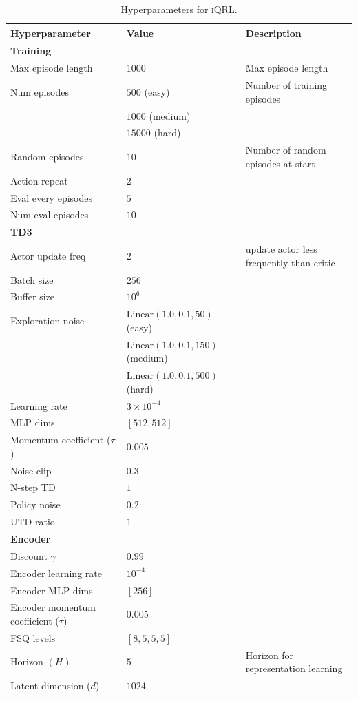 \documentclass{article}
\theoremstyle{plain}
\theoremstyle{definition}
\theoremstyle{remark}
\newcommand{\our}{\textsc{iQRL}\xspace}
\begin{document}
\begin{table}[t]
\caption{Hyperparameters for \our.}
\label{tab:hyperparameters}
\vskip 0.15in
\begin{center}
\begin{small}
\begin{sc}
\begin{tabular}{lll}
\toprule
Hyperparameter & Value & Description \\
\midrule
\textbf{Training} & & \\
Max episode length & 1000 &  Max episode length \\
Num episodes & $500$ (easy) & Number of training episodes \\
             & $1000$ (medium) & \\
             & $15000$ (hard) & \\
Random episodes & $10$ & Number of random episodes at start \\
Action repeat & 2 & \\
Eval every episodes & $5$ & \\
Num eval episodes & $10$ & \\
\hline
\textbf{TD3} & & \\
Actor update freq & $2$  & update actor less frequently than critic \\
Batch size & $256$ & \\
Buffer size & $10^{6}$ & \\
Exploration noise & $\mathrm{Linear}(1.0,0.1,50)$ (easy) & \\
                  & $\mathrm{Linear}(1.0,0.1,150)$ (medium) & \\
                  & $\mathrm{Linear}(1.0,0.1,500)$ (hard) & \\
Learning rate & $3 \times 10^{-4}$ & \\
MLP dims & $[512, 512]$ & \\
Momentum coefficient ($\tau$) & $0.005$ & \\
Noise clip & $0.3$ & \\
N-step TD & $1$ & \\
Policy noise & $0.2$ & \\
UTD ratio & $1$ & \\
\hline
\textbf{Encoder} &  & \\
Discount $\gamma$ & $0.99$ & \\
Encoder learning rate & $10^{-4}$ & \\
Encoder MLP dims & $[256]$ & \\
Encoder momentum coefficient ($\tau$) & 0.005 & \\
FSQ levels & $[8, 5, 5, 5]$ & \\
Horizon $(H)$ & $5$ & Horizon for representation learning \\
Latent dimension ($d$) & $1024$ & \\
\end{tabular}
\end{sc}
\end{small}
\end{center}
\vskip -0.1in
\end{table}
\end{document}
